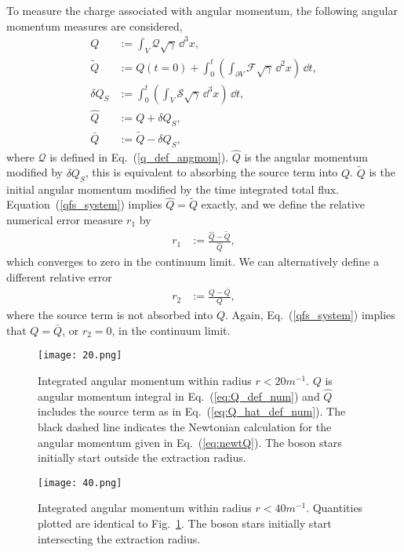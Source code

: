 To measure the charge associated with angular momentum, the following angular momentum measures are considered,
\begin{align}
\label{eq:Q_def_num}Q &:= \int_V \mathcal{Q} \sqrt{\gamma}\,\dd^3 x, \\
\tilde{Q} &:= Q(t=0) + \int_0^{t}\left(\int_{\partial V} \mathcal{F} \sqrt{\gamma}\,\dd^2 x \right)\,\dd t, \\
\delta Q_S &:= \int_0^{t}\left(\int_V \mathcal{S} \sqrt{\gamma}\,\dd^3 x \right)\,\dd t, \\
\label{eq:Q_hat_def_num}\hat{Q}&:= Q + \delta Q_S, \\
\bar{Q}&:= \tilde{Q} - \delta Q_S,
\end{align}
where $\mathcal{Q}$ is defined in Eq.~(\ref{q_def_angmom}). $\hat{Q}$ is the angular momentum modified by $\delta Q_S$, this is equivalent to absorbing the source term into $Q$. $\tilde{Q}$ is the initial angular momentum modified by the time integrated total flux. Equation~(\ref{qfs_system}) implies $\hat{Q}=\tilde{Q}$ exactly, and we define the relative numerical error measure $r_1$ by
\begin{align}\label{eq:r1def}
r_1&:= \frac{\hat{Q}-\tilde{Q}}{\hat{Q}},
\end{align}
which converges to zero in the continuum limit. We can alternatively define a different relative error
\begin{align}\label{eq:r2def}
r_2&:= \frac{{Q}-\bar{Q}}{{Q}},
\end{align}
where the source term is not absorbed into $Q$. Again, Eq.~(\ref{qfs_system}) implies that $Q = \bar{Q}$, or $r_2=0$, in the continuum limit.

\begin{figure}[h!]
{\texttt{[image: 20.png]}}
\caption{ Integrated angular momentum within radius $r<20 m^{-1}$. $Q$ is angular momentum integral in Eq.~(\ref{eq:Q_def_num}) and $\hat{Q}$ includes the source term as in Eq.~(\ref{eq:Q_hat_def_num}). The black dashed line indicates the Newtonian calculation for the angular momentum given in Eq.~(\ref{eq:newtQ}). The boson stars initially start outside the extraction radius. }
\label{fig:Q_20}
\end{figure}

\begin{figure}[h!]
{\texttt{[image: 40.png]}}
\caption{ Integrated angular momentum within radius $r<40 m^{-1}$. Quantities plotted are identical to Fig.~\ref{fig:Q_20}. The boson stars initially start intersecting the extraction radius.  }
\label{fig:Q_40}
\end{figure}

